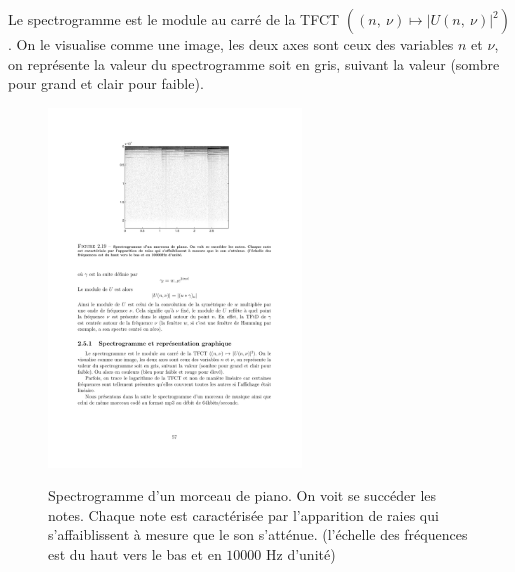Le spectrogramme est le module au carr\'{e} de la TFCT $((n,\ \nu)\mapsto|U(n,\ \nu)|^{2})$ . On le visualise comme une image, les deux axes sont ceux des variables $n$ et $\nu$, on repr\'{e}sente la valeur du spectrogramme soit en gris, suivant la valeur (sombre pour grand et clair pour faible).

\begin{figure}
  \centering
  \includegraphics[width=0.6\textwidth]{Figures/Figure2-19}\\
  \caption{Spectrogramme d'un morceau de piano. On voit se succ\'{e}der les notes. Chaque note est caract\'{e}ris\'{e}e par l'apparition de raies qui s'affaiblissent \`{a} mesure que le son s'att\'{e}nue. (l'\'{e}chelle des fr\'{e}quences est du haut vers le bas et en $10000$ Hz d'unit\'{e})}\label{fig:figure2-19}
\end{figure}



